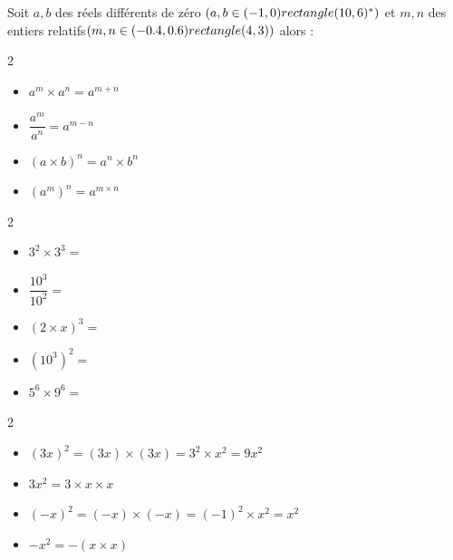 \begin{Propriété}
Soit $a,b$ des réels différents de zéro $(a,b \in (-1,0) rectangle (10,6)^\ast)$ et $m,n$ des entiers relatifs$(m,n \in (-0.4,0.6) rectangle (4,3))$ alors : 
\vspace{-0.5cm}
\begin{multicols}{2}
\begin{itemize}[label=\textcolor{Couleur2}{$\bullet$}]
\item $a^m\times a^n=a^{m+n}$
\item $\dfrac{a^m}{a^n}=a^{m-n}$
\item $(a\times b)^n=a^n\times b^n$
\item $(a^m)^n=a^{m\times n}$
\end{itemize}
\end{multicols}
\end{Propriété}

\begin{Exemples}
\leavevmode\vspace{-\baselineskip}
\vspace{-0.5cm}
\begin{multicols}{2}
\begin{itemize}[label=\textcolor{Couleur10}{$\bullet$}]
\item $3^2\times 3^3=$ \ligne

\item $\dfrac{10^3}{10^2}=$ \ligne

\item $(2\times x)^{3}=$ \ligne

\item $(10^3)^2=$ \ligne

\item $5^6\times 9^6=$ \ligne

\end{itemize}
\end{multicols}
\end{Exemples}

\begin{Remarque}
\leavevmode\vspace{-\baselineskip}
\vspace{-0.3cm}
\begin{multicols}{2}
\begin{itemize}[label=\textcolor{Couleur7}{$\bullet$}]
\item $(3x)^2=(3x)\times (3x)=3^2\times x^2=9x^2$
\item $3x^2=3\times x\times x$
\item $(-x)^2=(-x)\times (-x)=(-1)^2\times x^2=x^2$
\item $-x^2=-(x\times x)$
\end{itemize}
\end{multicols}
\end{Remarque}

